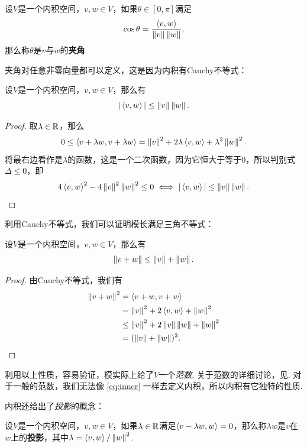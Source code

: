 \begin{definition}[夹角]
设$V$是一个内积空间，$v,w\in V$，如果$\theta\in[0,\pi]$满足
\[
    \cos\theta=\frac{\left\langle{v},{w}\right\rangle}{\left\|v\right\|\left\|w\right\|},
\]
那么称$\theta$是$v$与$w$的\textbf{夹角}. 
\end{definition}

夹角对任意非零向量都可以定义，这是因为内积有Cauchy不等式：

\begin{theorem}[Cauchy不等式]\label{thm:cauchy}
设$V$是一个内积空间，$v,w\in V$，那么有
\[
    |\left\langle{v},{w}\right\rangle|\leq \left\|v\right\|\left\|w\right\|.
\]
\end{theorem}

\begin{proof}
    取$\lambda\in \mathbb{R}$，那么
    \[
        0\leq \left\langle{v+\lambda w},{v+\lambda w}\right\rangle=\left\|v\right\|^2+2\lambda\left\langle{v},{w}\right\rangle+\lambda^2\left\|w\right\|^2.
    \]
将最右边看作是$\lambda$的函数，这是一个二次函数，因为它恒大于等于$0$，所以判别式$\Delta\leq 0$，即
\[
    4\left\langle{v},{w}\right\rangle^2-4\left\|v\right\|^2\left\|w\right\|^2\leq 0\iff |\left\langle{v},{w}\right\rangle|\leq \left\|v\right\|\left\|w\right\|.
\]
\end{proof}

利用Cauchy不等式，我们可以证明模长满足三角不等式：
\begin{theorem}[三角不等式]\label{thm:triangle}
设$V$是一个内积空间，$v,w\in V$，那么有
\[
    \left\|v+w\right\|\leq \left\|v\right\|+\left\|w\right\|.
\]
\end{theorem}

\begin{proof}
由Cauchy不等式，我们有
\begin{align*}
    \left\|v+w\right\|^2 &= \left\langle{v+w},{v+w}\right\rangle \\
    &= \left\|v\right\|^2+2\left\langle{v},{w}\right\rangle+\left\|w\right\|^2 \\
    &\leq \left\|v\right\|^2+2\left\|v\right\|\left\|w\right\|+\left\|w\right\|^2 \\
    &= (\left\|v\right\|+\left\|w\right\|)^2.
\end{align*}
\end{proof}

利用以上性质，容易验证，模实际上给了$V$一个\emph{范数}. 关于范数的详细讨论，见. 对于一般的范数，我们无法像 \eqref{eq:inner} 一样去定义内积，所以内积有它独特的性质. 

内积还给出了\emph{投影}的概念：

\begin{definition}[投影]
设$V$是一个内积空间，$v,w\in V$，如果$\lambda\in\mathbb{R}$满足$\left\langle{v-\lambda w},{w}\right\rangle=0$，那么称$\lambda w$是$v$在$w$上的\textbf{投影}，其中$\lambda=\left\langle{v},{w}\right\rangle/\left\|w\right\|^2$.
\end{definition}

